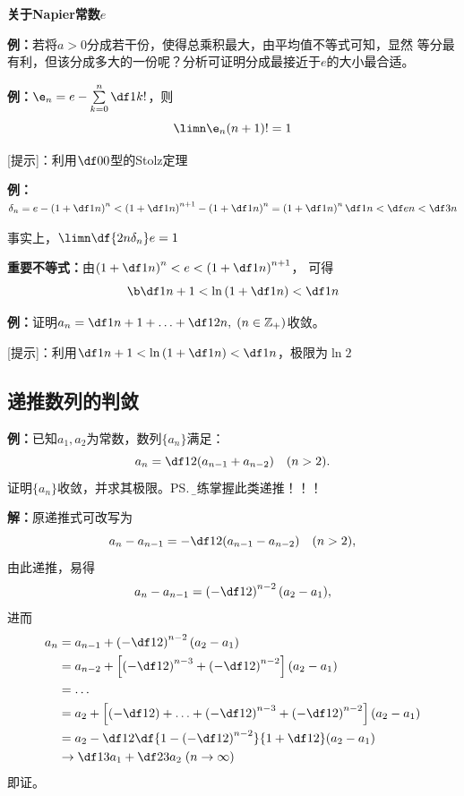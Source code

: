 \begin{shaded}
	{\bf 关于Napier常数$e$}
	
	{\bf 例：}若将$a>0$分成若干份，使得总乘积最大，由平均值不等式可知，显然
	等分最有利，但该分成多大的一份呢？分析可证明分成最接近于$e$的大小最合适。
	
	{\bf 例：}$\e_n=e-\sum\limits_{k=0}^n\df1{k!}$，则
	$$\limn\e_n(n+1)!=1$$
	
	[提示]：利用$\df00$型的Stolz定理
	
	{\bf 例：}$\delta_n=e-\left(1+\df1n\right)^n
	<\left(1+\df1n\right)^{n+1}-\left(1+\df1n\right)^n
	=\left(1+\df1n\right)^n\df1n<\df en<\df3n$
	
	事实上，$\limn\df{2n\delta_n}e=1$
	
	{\bf 重要不等式：}由{$\left(1+\df1n\right)^n<e<\left(1+\df1n\right)^{n+1}$}，
	可得
	$${\b \df1{n+1}<\ln\left(1+\df1n\right)<\df1n}$$

	{\bf 例：}证明$a_n=\df1{n+1}+\ldots+\df1{2n},\;(n\in\mathbb{Z}_+)$收敛。

	[提示]：利用$\df1{n+1}<\ln\left(1+\df1n\right)<\df1n$，极限为$\ln2$
% 	
\end{shaded}

\subsection{递推数列的判敛}

{\bf 例：}已知$a_1,a_2$为常数，数列$\{a_n\}$满足：
$$a_n=\df 12({a_{n-1}+a_{n-2}})\quad(n>2).$$
证明$\{a_n\}$收敛，并求其极限。\ps{\b 熟练掌握此类递推！！！}

{\bf 解：}原递推式可改写为
$$a_n-a_{n-1}=-\df12(a_{n-1}-a_{n-2})\quad(n>2),$$
由此递推，易得
$$a_n-a_{n-1}=\left(-\df12\right)^{n-2}(a_2-a_1),$$
进而
\begin{align}
	a_n&=a_{n-1}+\left(-\df12\right)^{n-2}(a_2-a_1)\notag\\
	&=a_{n-2}+\left[\left(-\df12\right)^{n-3}+\left(-\df12\right)^{n-2}\right]
	(a_2-a_1)\notag\\
	&=\ldots\notag\\
	&=a_2+\left[\left(-\df12\right)+\ldots+\left(-\df12\right)^{n-3}
	+\left(-\df12\right)^{n-2}\right](a_2-a_1)\notag\\
	&=a_2-\df12\df{1-\left(-\df12\right)^{n-2}}{1+\df12}(a_2-a_1)\notag\\
	&\to\df13a_1+\df23a_2\;(n\to\infty)\notag
\end{align}
即证。

